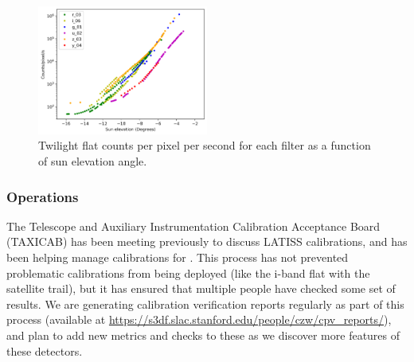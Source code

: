 \begin{figure}
  \centering
  \includegraphics[width=0.5\textwidth]{calibration_data_figures/twilight_flat_counts.png}
  \caption{Twilight flat counts per pixel per second for each filter as a function of sun elevation angle.}
  \label{fig:twilight_counts}
\end{figure}

\subsubsection{Operations}

The Telescope and Auxiliary Instrumentation Calibration Acceptance Board (TAXICAB) has been meeting previously to discuss LATISS calibrations, and has been helping manage calibrations for \ComCam.
This process has not prevented problematic calibrations from being deployed (like the i-band flat with the satellite trail), but it has ensured that multiple people have checked some set of results.
We are generating calibration verification reports regularly as part of this process (available at \url{https://s3df.slac.stanford.edu/people/czw/cpv_reports/}), and plan to add new metrics and checks to these as we discover more features of these detectors.
